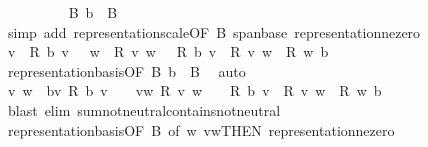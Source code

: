 \begin{isabellebody}
\ \ \ \ \ \ \ \ \isamarkupfalse%
\ B\ {\isacartoucheopen}b\ {\isasymin}\ B{\isacartoucheclose}\ \isamarkupfalse%
\ {\isacharparenleft}{\kern0pt}simp\ add{\isacharcolon}{\kern0pt}\ representation{\isacharunderscore}{\kern0pt}scale{\isacharbrackleft}{\kern0pt}OF\ B{\isacharbrackright}{\kern0pt}\ span{\isacharunderscore}{\kern0pt}base\ representation{\isacharunderscore}{\kern0pt}ne{\isacharunderscore}{\kern0pt}zero{\isacharparenright}{\kern0pt}\isanewline
\ \ \ \ \ \ \isamarkupfalse%
\ \isamarkupfalse%
\ {\isachardoublequoteopen}{\isacharparenleft}{\kern0pt}{\isasymSum}v\ {\isacharbar}{\kern0pt}\ {\isacharquery}{\kern0pt}R{\isacharprime}{\kern0pt}\ b\ v\ {\isasymnoteq}\ {}{\isachardot}{\kern0pt}\ {\isasymSum}w\ {\isacharbar}{\kern0pt}\ {\isacharquery}{\kern0pt}R\ v\ w\ {\isasymnoteq}\ {}{\isachardot}{\kern0pt}\ {\isacharquery}{\kern0pt}R{\isacharprime}{\kern0pt}\ b\ v\ {\isacharasterisk}{\kern0pt}\ {\isacharquery}{\kern0pt}R\ v\ w\ {\isacharasterisk}{\kern0pt}\ {\isacharquery}{\kern0pt}R\ w\ b{\isacharparenright}{\kern0pt}\ {\isasymnoteq}\ {}{\isachardoublequoteclose}\isanewline
\ \ \ \ \ \ \ \ \isamarkupfalse%
\ representation{\isacharunderscore}{\kern0pt}basis{\isacharbrackleft}{\kern0pt}OF\ B\ {\isacartoucheopen}b\ {\isasymin}\ B{\isacartoucheclose}{\isacharbrackright}{\kern0pt}\ \isamarkupfalse%
\ auto\isanewline
\ \ \ \ \ \ \isamarkupfalse%
\ \isamarkupfalse%
\ v\ w\ \ bv{\isacharcolon}{\kern0pt}\ {\isachardoublequoteopen}{\isacharquery}{\kern0pt}R{\isacharprime}{\kern0pt}\ b\ v\ {\isasymnoteq}\ {}{\isachardoublequoteclose}\ \ vw{\isacharcolon}{\kern0pt}\ {\isachardoublequoteopen}{\isacharquery}{\kern0pt}R\ v\ w\ {\isasymnoteq}\ {}{\isachardoublequoteclose}\ \ {\isachardoublequoteopen}{\isacharquery}{\kern0pt}R{\isacharprime}{\kern0pt}\ b\ v\ {\isacharasterisk}{\kern0pt}\ {\isacharquery}{\kern0pt}R\ v\ w\ {\isacharasterisk}{\kern0pt}\ {\isacharquery}{\kern0pt}R\ w\ b\ {\isasymnoteq}\ {}{\isachardoublequoteclose}\isanewline
\ \ \ \ \ \ \ \ \isamarkupfalse%
\ {\isacharparenleft}{\kern0pt}blast\ elim{\isacharcolon}{\kern0pt}\ sum{\isachardot}{\kern0pt}not{\isacharunderscore}{\kern0pt}neutral{\isacharunderscore}{\kern0pt}contains{\isacharunderscore}{\kern0pt}not{\isacharunderscore}{\kern0pt}neutral{\isacharparenright}{\kern0pt}\isanewline
\ \ \ \ \ \ \isamarkupfalse%
\ representation{\isacharunderscore}{\kern0pt}basis{\isacharbrackleft}{\kern0pt}OF\ B{\isacharcomma}{\kern0pt}\ of\ w{\isacharbrackright}{\kern0pt}\ vw{\isacharbrackleft}{\kern0pt}THEN\ representation{\isacharunderscore}{\kern0pt}ne{\isacharunderscore}{\kern0pt}zero{\isacharbrackright}{\kern0pt}\isanewline

\end{isabellebody}
